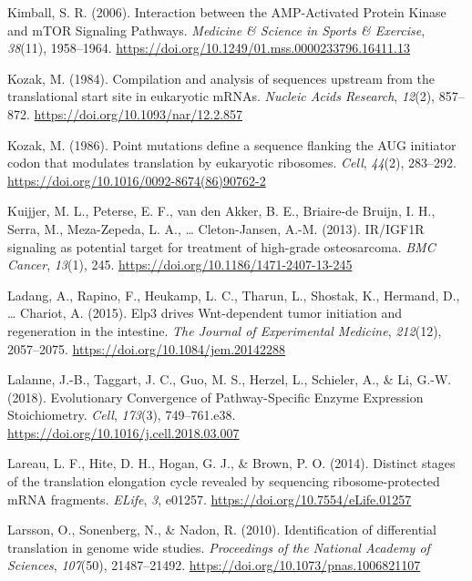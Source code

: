 \documentclass[12pt,openany]{book}
\begin{document}
\hypertarget{ref-Kimball2006}{}
Kimball, S. R. (2006). Interaction between the AMP-Activated Protein
Kinase and mTOR Signaling Pathways. \emph{Medicine \& Science in Sports
\& Exercise}, \emph{38}(11), 1958--1964.
\url{https://doi.org/10.1249/01.mss.0000233796.16411.13}

\hypertarget{ref-Kozak1984}{}
Kozak, M. (1984). Compilation and analysis of sequences upstream from
the translational start site in eukaryotic mRNAs. \emph{Nucleic Acids
Research}, \emph{12}(2), 857--872.
\url{https://doi.org/10.1093/nar/12.2.857}

\hypertarget{ref-Kozak1986}{}
Kozak, M. (1986). Point mutations define a sequence flanking the AUG
initiator codon that modulates translation by eukaryotic ribosomes.
\emph{Cell}, \emph{44}(2), 283--292.
\url{https://doi.org/10.1016/0092-8674(86)90762-2}

\hypertarget{ref-Kuijjer2013}{}
Kuijjer, M. L., Peterse, E. F., van den Akker, B. E., Briaire-de Bruijn,
I. H., Serra, M., Meza-Zepeda, L. A., \ldots{} Cleton-Jansen, A.-M.
(2013). IR/IGF1R signaling as potential target for treatment of
high-grade osteosarcoma. \emph{BMC Cancer}, \emph{13}(1), 245.
\url{https://doi.org/10.1186/1471-2407-13-245}

\hypertarget{ref-Ladang2015}{}
Ladang, A., Rapino, F., Heukamp, L. C., Tharun, L., Shostak, K.,
Hermand, D., \ldots{} Chariot, A. (2015). Elp3 drives Wnt-dependent
tumor initiation and regeneration in the intestine. \emph{The Journal of
Experimental Medicine}, \emph{212}(12), 2057--2075.
\url{https://doi.org/10.1084/jem.20142288}

\hypertarget{ref-Lalanne2018}{}
Lalanne, J.-B., Taggart, J. C., Guo, M. S., Herzel, L., Schieler, A., \&
Li, G.-W. (2018). Evolutionary Convergence of Pathway-Specific Enzyme
Expression Stoichiometry. \emph{Cell}, \emph{173}(3), 749--761.e38.
\url{https://doi.org/10.1016/j.cell.2018.03.007}

\hypertarget{ref-Lareau2014}{}
Lareau, L. F., Hite, D. H., Hogan, G. J., \& Brown, P. O. (2014).
Distinct stages of the translation elongation cycle revealed by
sequencing ribosome-protected mRNA fragments. \emph{ELife}, \emph{3},
e01257. \url{https://doi.org/10.7554/eLife.01257}

\hypertarget{ref-Larsson2010}{}
Larsson, O., Sonenberg, N., \& Nadon, R. (2010). Identification of
differential translation in genome wide studies. \emph{Proceedings of
the National Academy of Sciences}, \emph{107}(50), 21487--21492.
\url{https://doi.org/10.1073/pnas.1006821107}
\end{document}
